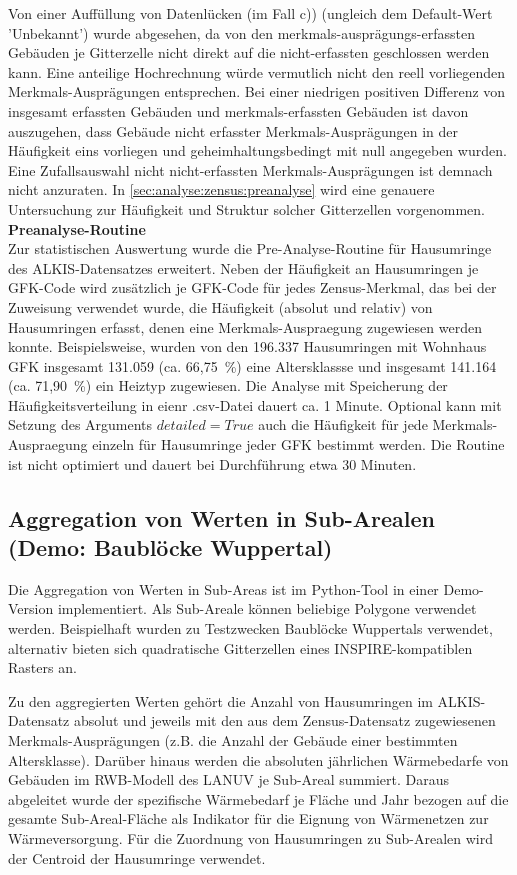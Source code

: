 			Von einer Auffüllung von Datenlücken (im Fall c)) (ungleich dem Default-Wert 'Unbekannt') wurde abgesehen, da von den merkmals-ausprägungs-erfassten Gebäuden je Gitterzelle nicht direkt auf die nicht-erfassten geschlossen werden kann. Eine anteilige Hochrechnung würde vermutlich nicht den reell vorliegenden Merkmals-Ausprägungen entsprechen. Bei einer niedrigen positiven Differenz von insgesamt erfassten Gebäuden und merkmals-erfassten Gebäuden ist davon auszugehen, dass Gebäude nicht erfasster Merkmals-Ausprägungen in der Häufigkeit eins vorliegen und geheimhaltungsbedingt mit null angegeben wurden. Eine Zufallsauswahl nicht nicht-erfassten Merkmals-Ausprägungen ist demnach nicht anzuraten. In \autoref{sec:analyse:zensus:preanalyse} wird eine genauere Untersuchung zur Häufigkeit und Struktur solcher Gitterzellen vorgenommen.\\
			
			\textbf{Preanalyse-Routine}\\
			Zur statistischen Auswertung wurde die Pre-Analyse-Routine für Hausumringe des ALKIS-Datensatzes erweitert. Neben der Häufigkeit an Hausumringen je GFK-Code wird zusätzlich je GFK-Code für jedes Zensus-Merkmal, das bei der Zuweisung verwendet wurde, die Häufigkeit (absolut und relativ) von Hausumringen erfasst, denen eine Merkmals-Auspraegung zugewiesen werden konnte. Beispielsweise, wurden von den 196.337 Hausumringen mit Wohnhaus GFK insgesamt 131.059 (ca. 66,75~\%) eine Altersklassse und insgesamt 141.164 (ca. 71,90~\%) ein Heiztyp zugewiesen. Die Analyse mit Speicherung der Häufigkeitsverteilung in eienr .csv-Datei dauert ca. 1 Minute. Optional kann mit Setzung des Arguments $detailed = True$ auch die Häufigkeit für jede Merkmals-Auspraegung einzeln für Hausumringe jeder GFK bestimmt werden. Die Routine ist nicht optimiert und dauert bei Durchführung etwa 30 Minuten. 
				
		\subsection{Aggregation von Werten in Sub-Arealen (Demo: Baublöcke Wuppertal)}
			Die Aggregation von Werten in Sub-Areas ist im Python-Tool in einer Demo-Version implementiert. Als Sub-Areale können beliebige Polygone verwendet werden. Beispielhaft wurden zu Testzwecken Baublöcke Wuppertals verwendet, alternativ bieten sich quadratische Gitterzellen eines INSPIRE-kompatiblen Rasters an. \cite{web_download_baubloecke_wuppertal}
			
			Zu den aggregierten Werten gehört die Anzahl von Hausumringen im ALKIS-Datensatz absolut und jeweils mit den aus dem Zensus-Datensatz zugewiesenen Merkmals-Ausprägungen (z.B. die Anzahl der Gebäude einer bestimmten Altersklasse). Darüber hinaus werden die absoluten jährlichen Wärmebedarfe von Gebäuden im RWB-Modell des LANUV je Sub-Areal summiert. Daraus abgeleitet wurde der spezifische Wärmebedarf je Fläche und Jahr bezogen auf die gesamte Sub-Areal-Fläche als Indikator für die Eignung von Wärmenetzen zur Wärmeversorgung. Für die Zuordnung von Hausumringen zu Sub-Arealen wird der Centroid der Hausumringe verwendet.
			
